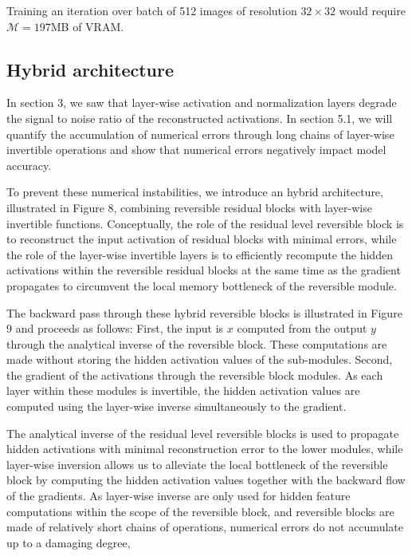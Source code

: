 \documentclass[twocolumn]{bmcart}
\begin{document}
Training an iteration over batch of 512 images of resolution $32 \times 32$ would require $\mathcal{M}=197$MB of VRAM. 

\subsection{Hybrid architecture}

In section 3, we saw that layer-wise activation and normalization layers degrade the signal to noise ratio of the reconstructed activations.
In section 5.1, we will quantify the accumulation of numerical errors through long chains of layer-wise invertible operations and show that numerical errors negatively impact model accuracy.

To prevent these numerical instabilities, we introduce an hybrid architecture, illustrated in Figure 8, combining reversible residual blocks with layer-wise invertible functions.
Conceptually, the role of the residual level reversible block is to reconstruct the input activation of residual blocks with minimal errors, 
while the role of the layer-wise invertible layers is to efficiently recompute the hidden activations within the reversible residual 
blocks at the same time as the gradient propagates to circumvent the local memory bottleneck of the reversible module.

The backward pass through these hybrid reversible blocks is illustrated in Figure 9 and proceeds as follows: 
First, the input is $x$ computed from the output $y$ through the analytical inverse of the reversible block.
These computations are made without storing the hidden activation values of the sub-modules.
Second, the gradient of the activations through the reversible block modules.
As each layer within these modules is invertible, the hidden activation values 
are computed using the layer-wise inverse simultaneously to the gradient.

The analytical inverse of the residual level reversible blocks is used to propagate hidden activations with minimal reconstruction error to the lower modules,
while layer-wise inversion allows us to alleviate the local bottleneck of the reversible block by computing the hidden activation values together with the backward flow of the gradients. 
As layer-wise inverse are only used for hidden feature computations within the scope of the reversible block, 
and reversible blocks are made of relatively short chains of operations,
numerical errors do not accumulate up to a damaging degree,
\end{document}
